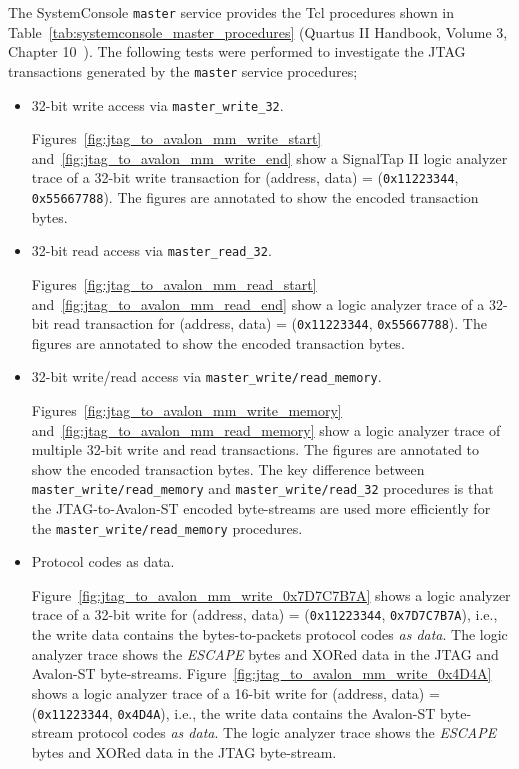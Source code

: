 \documentclass[10pt,twoside]{article}
\begin{document}
The SystemConsole \verb+master+ service provides the
Tcl procedures shown in Table~\ref{tab:systemconsole_master_procedures}
(Quartus II Handbook, Volume 3, Chapter 10~\cite{Altera_Quartus_Handbook_2011}).
The following tests were performed to investigate the JTAG transactions
generated by the \verb+master+ service procedures;
%
\begin{itemize}
\item 32-bit write access via \verb+master_write_32+.

Figures~\ref{fig:jtag_to_avalon_mm_write_start} 
and~\ref{fig:jtag_to_avalon_mm_write_end} show a SignalTap II logic
analyzer trace of a 32-bit write transaction for 
(address, data) = (\verb+0x11223344+, \verb+0x55667788+).
The figures are annotated to show the encoded transaction bytes.

\item 32-bit read access via \verb+master_read_32+.

Figures~\ref{fig:jtag_to_avalon_mm_read_start} 
and~\ref{fig:jtag_to_avalon_mm_read_end} show a logic
analyzer trace of a 32-bit read transaction for 
(address, data) = (\verb+0x11223344+, \verb+0x55667788+).
The figures are annotated to show the encoded transaction bytes.

\item 32-bit write/read access via \verb+master_write/read_memory+.

Figures~\ref{fig:jtag_to_avalon_mm_write_memory} 
and~\ref{fig:jtag_to_avalon_mm_read_memory} show a logic
analyzer trace of multiple 32-bit write and read transactions.
The figures are annotated to show the encoded transaction bytes.
The key difference between \verb+master_write/read_memory+
and \verb+master_write/read_32+ procedures is that the JTAG-to-Avalon-ST
encoded byte-streams are used more efficiently for the
\verb+master_write/read_memory+ procedures.

\item Protocol codes as data.

Figure~\ref{fig:jtag_to_avalon_mm_write_0x7D7C7B7A} shows a logic
analyzer trace of a 32-bit write for 
(address, data) = (\verb+0x11223344+, \verb+0x7D7C7B7A+),
i.e., the write data contains the bytes-to-packets
protocol codes {\em as data}. The logic analyzer trace shows
the {\em ESCAPE} bytes and XORed data in the JTAG and
Avalon-ST byte-streams.
%
Figure~\ref{fig:jtag_to_avalon_mm_write_0x4D4A} shows a logic
analyzer trace of a 16-bit write for 
(address, data) = (\verb+0x11223344+, \verb+0x4D4A+),
i.e., the write data contains the Avalon-ST byte-stream
protocol codes {\em as data}. The logic analyzer trace shows
the {\em ESCAPE} bytes and XORed data in the JTAG byte-stream.


\end{itemize}
\end{document}
